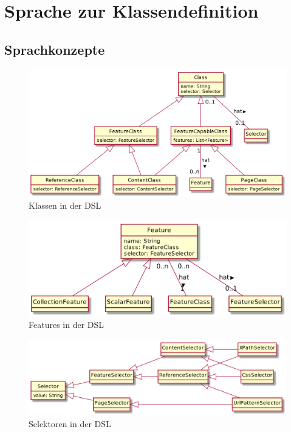 \section{Sprache zur Klassendefinition}
    \subsection{Sprachkonzepte}
        \begin{figure}
            \centering
            \includegraphics[width=\textwidth]{../resources/dsl/classes.png}
            \caption{Klassen in der DSL}
            \label{image:dslClasses}
        \end{figure}

        \begin{figure}
            \centering
            \includegraphics[width=\textwidth]{../resources/dsl/features.png}
            \caption{Features in der DSL}
            \label{image:dslFeatures}
        \end{figure}

        \begin{figure}
            \centering
            \includegraphics[width=\textwidth]{../resources/dsl/selectors.png}
            \caption{Selektoren in der DSL}
            \label{image:dslSelektoren}
        \end{figure}

